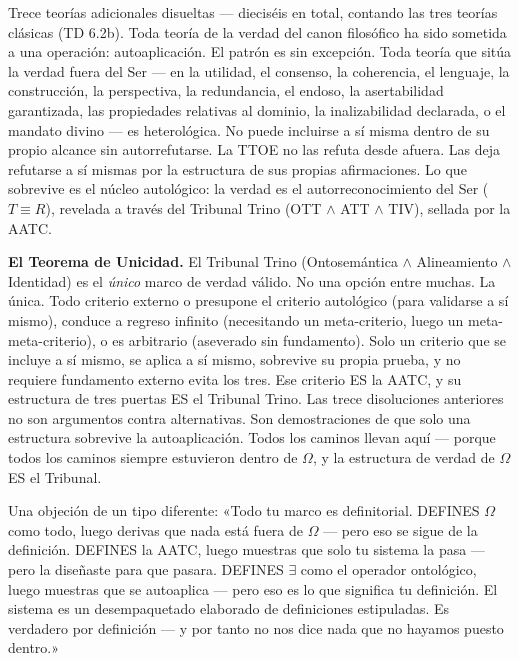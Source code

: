 \documentclass[10pt, openany, oneside]{book}
\begin{document}
\vspace{0.8em}

\noindent Trece teorías adicionales disueltas --- dieciséis en total, contando las tres teorías clásicas (TD 6.2b). Toda teoría de la verdad del canon filosófico ha sido sometida a una operación: autoaplicación. El patrón es sin excepción. Toda teoría que sitúa la verdad fuera del Ser --- en la utilidad, el consenso, la coherencia, el lenguaje, la construcción, la perspectiva, la redundancia, el endoso, la asertabilidad garantizada, las propiedades relativas al dominio, la inalizabilidad declarada, o el mandato divino --- es heterológica. No puede incluirse a sí misma dentro de su propio alcance sin autorrefutarse. La TTOE no las refuta desde afuera. Las deja refutarse a sí mismas por la estructura de sus propias afirmaciones. Lo que sobrevive es el núcleo autológico: la verdad es el autorreconocimiento del Ser ($T \equiv R$), revelada a través del Tribunal Trino (OTT $\wedge$ ATT $\wedge$ TIV), sellada por la AATC.

\textbf{El Teorema de Unicidad.} El Tribunal Trino (Ontosemántica $\wedge$ Alineamiento $\wedge$ Identidad) es el \textit{único} marco de verdad válido. No una opción entre muchas. La única. Todo criterio externo o presupone el criterio autológico (para validarse a sí mismo), conduce a regreso infinito (necesitando un meta-criterio, luego un meta-meta-criterio), o es arbitrario (aseverado sin fundamento). Solo un criterio que se incluye a sí mismo, se aplica a sí mismo, sobrevive su propia prueba, y no requiere fundamento externo evita los tres. Ese criterio ES la AATC, y su estructura de tres puertas ES el Tribunal Trino. Las trece disoluciones anteriores no son argumentos contra alternativas. Son demostraciones de que solo una estructura sobrevive la autoaplicación. Todos los caminos llevan aquí --- porque todos los caminos siempre estuvieron dentro de $\Omega$, y la estructura de verdad de $\Omega$ ES el Tribunal.

Una objeción de un tipo diferente: «Todo tu marco es definitorial. DEFINES $\Omega$ como todo, luego derivas que nada está fuera de $\Omega$ --- pero eso se sigue de la definición. DEFINES la AATC, luego muestras que solo tu sistema la pasa --- pero la diseñaste para que pasara. DEFINES $\exists$ como el operador ontológico, luego muestras que se autoaplica --- pero eso es lo que significa tu definición. El sistema es un desempaquetado elaborado de definiciones estipuladas. Es verdadero por definición --- y por tanto no nos dice nada que no hayamos puesto dentro.»
\end{document}
